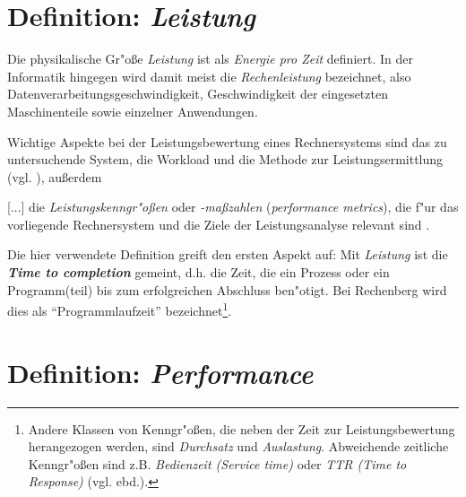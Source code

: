 \section{Definition: \textit{Leistung}}\label{Leistung}

Die physikalische Gr"o\ss e \textit{Leistung} ist als \textit{Energie pro Zeit} definiert. In der Informatik hingegen wird damit meist die \textit{Rechenleistung} bezeichnet, also Datenverarbeitungsgeschwindigkeit, Geschwindigkeit der eingesetzten Maschinenteile sowie einzelner Anwendungen. %

Wichtige Aspekte bei der Leistungsbewertung eines Rechnersystems sind das zu untersuchende System, die Workload und die Methode zur Leistungsermittlung (vgl. \cite{rec06}), au\ss erdem 

[...] die \textit{Leistungskenngr"o\ss en} oder \textit{-ma\ss zahlen} (\textit{performance metrics}), die f"ur das vorliegende Rechnersystem und die Ziele der Leistungsanalyse relevant sind \cite{rec06}. 

Die hier verwendete Definition greift den ersten Aspekt auf: Mit \textit{Leistung} ist die \textbf{\textit{Time to completion}} gemeint, d.h. die Zeit, die ein Prozess oder ein Programm(teil) bis zum erfolgreichen Abschluss ben"otigt. Bei Rechenberg wird dies als "`Programmlaufzeit"' \cite{rec06} bezeichnet\footnote{Andere Klassen von Kenngr"o\ss en, die neben der Zeit zur Leistungsbewertung herangezogen werden, sind \textit{Durchsatz} und \textit{Auslastung}. Abweichende zeitliche Kenngr"o\ss en sind z.B. \textit{Bedienzeit (Service time)} oder \textit{TTR (Time to Response)} (vgl. ebd.).}. 

\section{Definition: \textit{Performance}}\label{Performance}

